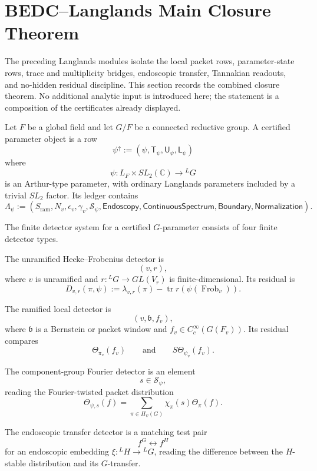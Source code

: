 \section{BEDC--Langlands Main Closure Theorem}
\label{sec:unified-reality-bedc-langlands-main-closure-theorem}

The preceding Langlands modules isolate the local packet rows,
parameter-state rows, trace and multiplicity bridges, endoscopic
transfer, Tannakian readouts, and no-hidden residual discipline. This
section records the combined closure theorem. No additional analytic
input is introduced here; the statement is a composition of the
certificates already displayed.

\begin{definition}
\label{def:unified-reality-certified-langlands-parameter-object}
Let $F$ be a global field and let $G/F$ be a connected reductive group.
A certified parameter object is a row
$$
\psi^\uparrow
:=
(\psi,\mathsf T_\psi,\mathsf U_\psi,\mathsf L_\psi)
$$
where
$$
\psi:L_F\times SL_2(\mathbb C)\to{}^LG
$$
is an Arthur-type parameter, with ordinary Langlands parameters included
by a trivial $SL_2$ factor. Its ledger contains
$$
\Lambda_\psi
:=
(S_{\mathrm{ram}},N_v,\epsilon_v,\gamma_v,\mathcal S_\psi,
\mathsf{Endoscopy},\mathsf{ContinuousSpectrum},\mathsf{Boundary},
\mathsf{Normalization}).
$$
\end{definition}

\begin{definition}
\label{def:unified-reality-main-langlands-detector-system}
The finite detector system for a certified $G$-parameter consists of
four finite detector types.

The unramified Hecke--Frobenius detector is
$$
(v,r),
$$
where $v$ is unramified and $r:{}^LG\to GL(V_r)$ is
finite-dimensional. Its residual is
$$
D_{v,r}(\pi,\psi)
:=
\lambda_{v,r}(\pi)
-
\operatorname{tr}r(\psi(\operatorname{Frob}_v)).
$$

The ramified local detector is
$$
(v,\mathfrak b,f_v),
$$
where $\mathfrak b$ is a Bernstein or packet window and
$f_v\in C_c^\infty(G(F_v))$. Its residual compares
$$
\Theta_{\pi_v}(f_v)
\qquad\text{and}\qquad
S\Theta_{\psi_v}(f_v).
$$

The component-group Fourier detector is an element
$$
s\in\mathcal S_\psi,
$$
reading the Fourier-twisted packet distribution
$$
\Theta_{\psi,s}(f)
=
\sum_{\pi\in\Pi_\psi(G)}
\chi_\pi(s)\Theta_\pi(f).
$$

The endoscopic transfer detector is a matching test pair
$$
f^G\leftrightarrow f^H
$$
for an endoscopic embedding $\xi:{}^LH\to{}^LG$, reading the difference
between the $H$-stable distribution and its $G$-transfer.
\end{definition}

